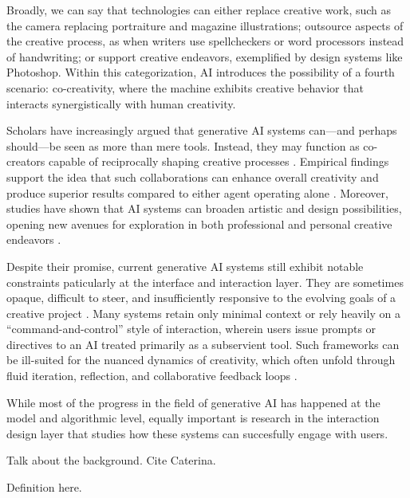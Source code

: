 Broadly, we can say that technologies can either replace creative work, such as the camera replacing portraiture and magazine illustrations; outsource aspects of the creative process, as when writers use spellcheckers or word processors instead of handwriting; or support creative endeavors, exemplified by design systems like Photoshop. Within this categorization, AI introduces the possibility of a fourth scenario: co-creativity, where the machine exhibits creative behavior that interacts synergistically with human creativity. 

Scholars have increasingly argued that generative AI systems can—and perhaps should—be seen as more than mere tools. Instead, they may function as co-creators capable of reciprocally shaping creative processes \cite{Davis2013-jy, Rezwana2023-rt, Wan2023-he, McCormack2008-rs, Lawton2023-tb, Bown2020-zn, Moruzzi2024-cq}. Empirical findings support the idea that such collaborations can enhance overall creativity and produce superior results compared to either agent operating alone \cite{Jia2024-vp, Hitsuwari2023-tw, Vaccaro2024-ne}. Moreover, studies have shown that AI systems can broaden artistic and design possibilities, opening new avenues for exploration in both professional and personal creative endeavors \cite{Bown2018-op, Ocampo2024-dv, Park2024-gw, Palani2024-on, Oh2018-mu}.

Despite their promise, current generative AI systems still exhibit notable constraints paticularly at the interface and interaction layer. They are sometimes opaque, difficult to steer, and insufficiently responsive to the evolving goals of a creative project \cite{Moruzzi2024-cq, El-Assady2022-qc}. Many systems retain only minimal context or rely heavily on a “command-and-control” style of interaction, wherein users issue prompts or directives to an AI treated primarily as a subservient tool. Such frameworks can be ill-suited for the nuanced dynamics of creativity, which often unfold through fluid iteration, reflection, and collaborative feedback loops \cite{Guzik2023-cl, Bown2021-os, Alexander2024-pz, Haase2023-vz}.

While most of the progress in the field of generative AI has happened at the model and algorithmic level, equally important is research in the interaction design layer \cite{Lin2023-zq, Bown2021-os} that studies how these systems can succesfully engage with users. 

Talk about the background. Cite Caterina. 

Definition here. 

